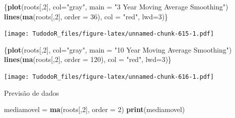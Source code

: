 \documentclass[
]{book}
\newenvironment{Shaded}{\begin{snugshade}}{\end{snugshade}}
\newcommand{\DataTypeTok}[1]{\textcolor[rgb]{0.13,0.29,0.53}{#1}}
\newcommand{\DecValTok}[1]{\textcolor[rgb]{0.00,0.00,0.81}{#1}}
\newcommand{\KeywordTok}[1]{\textcolor[rgb]{0.13,0.29,0.53}{\textbf{#1}}}
\newcommand{\NormalTok}[1]{#1}
\newcommand{\StringTok}[1]{\textcolor[rgb]{0.31,0.60,0.02}{#1}}
\begin{document}
\begin{Shaded}
\begin{Highlighting}[]
\NormalTok{\{}\KeywordTok{plot}\NormalTok{(roots[,}\DecValTok{2}\NormalTok{], }\DataTypeTok{col=}\StringTok{"gray"}\NormalTok{, }\DataTypeTok{main =} \StringTok{"3 Year Moving Average Smoothing"}\NormalTok{)}
\KeywordTok{lines}\NormalTok{(}\KeywordTok{ma}\NormalTok{(roots[,}\DecValTok{2}\NormalTok{], }\DataTypeTok{order =} \DecValTok{36}\NormalTok{), }\DataTypeTok{col =} \StringTok{"red"}\NormalTok{, }\DataTypeTok{lwd=}\DecValTok{3}\NormalTok{)\}}
\end{Highlighting}
\end{Shaded}

\texttt{[image: TudodoR\_files/figure-latex/unnamed-chunk-615-1.pdf]}

\begin{Shaded}
\begin{Highlighting}[]
\NormalTok{\{}\KeywordTok{plot}\NormalTok{(roots[,}\DecValTok{2}\NormalTok{], }\DataTypeTok{col=}\StringTok{"gray"}\NormalTok{, }\DataTypeTok{main =} \StringTok{"10 Year Moving Average Smoothing"}\NormalTok{)}
\KeywordTok{lines}\NormalTok{(}\KeywordTok{ma}\NormalTok{(roots[,}\DecValTok{2}\NormalTok{], }\DataTypeTok{order =} \DecValTok{120}\NormalTok{), }\DataTypeTok{col =} \StringTok{"red"}\NormalTok{, }\DataTypeTok{lwd=}\DecValTok{3}\NormalTok{)\}}
\end{Highlighting}
\end{Shaded}

\texttt{[image: TudodoR\_files/figure-latex/unnamed-chunk-616-1.pdf]}

Previsão de dados

\begin{Shaded}
\begin{Highlighting}[]
\NormalTok{mediamovel =}\StringTok{ }\KeywordTok{ma}\NormalTok{(roots[,}\DecValTok{2}\NormalTok{], }\DataTypeTok{order =} \DecValTok{2}\NormalTok{)}
\KeywordTok{print}\NormalTok{(mediamovel)}
\end{Highlighting}
\end{Shaded}
\end{document}
